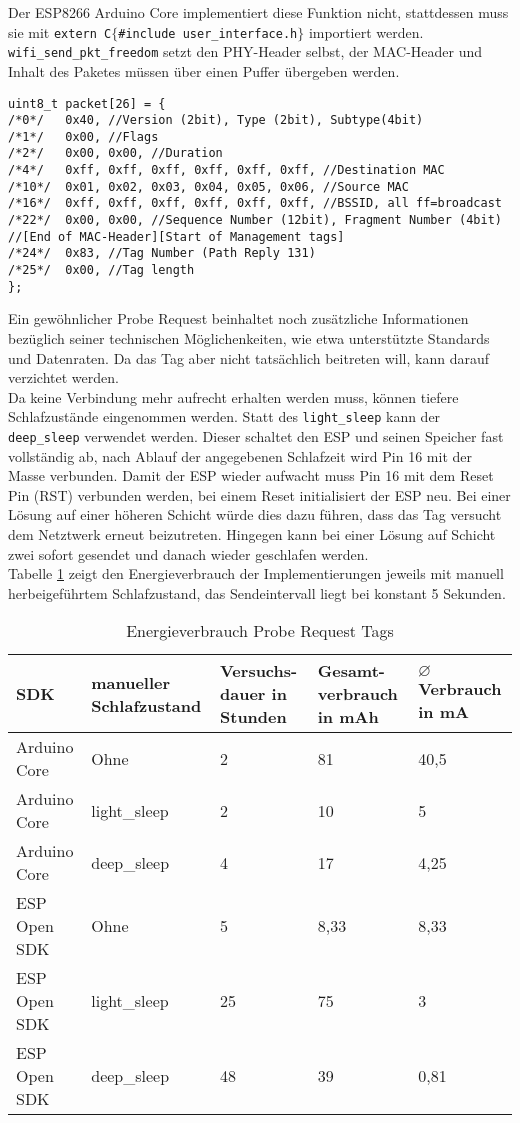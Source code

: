 Der ESP8266 Arduino Core implementiert diese Funktion nicht, stattdessen muss sie mit \texttt{extern \dq C\dq $\lbrace$\#include \dq user\_interface.h\dq $\rbrace$} importiert werden. \\
\texttt{wifi\_send\_pkt\_freedom} setzt den PHY-Header selbst, der MAC-Header und Inhalt des Paketes müssen über einen Puffer übergeben werden.
\begin{verbatim}
uint8_t packet[26] = { 
/*0*/ 	0x40, //Version (2bit), Type (2bit), Subtype(4bit)
/*1*/ 	0x00, //Flags 
/*2*/ 	0x00, 0x00, //Duration
/*4*/   0xff, 0xff, 0xff, 0xff, 0xff, 0xff, //Destination MAC
/*10*/  0x01, 0x02, 0x03, 0x04, 0x05, 0x06, //Source MAC
/*16*/  0xff, 0xff, 0xff, 0xff, 0xff, 0xff, //BSSID, all ff=broadcast
/*22*/  0x00, 0x00, //Sequence Number (12bit), Fragment Number (4bit) 
//[End of MAC-Header][Start of Management tags]
/*24*/  0x83, //Tag Number (Path Reply 131) 
/*25*/ 	0x00, //Tag length
}; 
\end{verbatim}
Ein gewöhnlicher Probe Request beinhaltet noch zusätzliche Informationen bezüglich seiner technischen Möglichenkeiten, wie etwa unterstützte Standards und Datenraten. 
Da das Tag aber nicht tatsächlich beitreten will, kann darauf verzichtet werden. \\
Da keine Verbindung mehr aufrecht erhalten werden muss, können tiefere Schlafzustände eingenommen werden. 
Statt des \texttt{light\_sleep} kann der \texttt{deep\_sleep} verwendet werden.
Dieser schaltet den ESP und seinen Speicher fast vollständig ab, nach Ablauf der angegebenen Schlafzeit wird Pin 16 mit der Masse verbunden.
Damit der ESP wieder aufwacht muss Pin 16 mit dem Reset Pin (RST) verbunden werden, bei einem Reset initialisiert der ESP neu.
Bei einer Lösung auf einer höheren Schicht würde dies dazu führen, dass das Tag versucht dem Netztwerk erneut beizutreten. 
Hingegen kann bei einer Lösung auf Schicht zwei sofort gesendet und danach wieder geschlafen werden.\\
Tabelle \ref{table:probeconsumption} zeigt den Energieverbrauch der Implementierungen jeweils mit manuell herbeigeführtem Schlafzustand, das Sendeintervall liegt bei konstant 5 Sekunden.
\begin{table}[h]
	\centering
	\caption{Energieverbrauch Probe Request Tags}
	\label{table:probeconsumption}
	\begin{tabular}{p{3cm}|p{2.4cm}|p{2cm}|p{2cm}|p{2cm}}
		SDK & manueller Schlafzustand  & Versuchs-dauer in Stunden & Gesamt-verbrauch in mAh & $\varnothing$ Verbrauch in mA \\
		\hline
		Arduino Core & Ohne & 2 & 81 & 40,5 \\
		Arduino Core & light\_sleep & 2 & 10 & 5 \\
		Arduino Core & deep\_sleep & 4 & 17 & 4,25 \\
		ESP Open SDK & Ohne & 5 & 8,33 & 8,33 \\
		ESP Open SDK & light\_sleep & 25 & 75 & 3 \\
		ESP Open SDK & deep\_sleep & 48 & 39 & 0,81 \\
	\end{tabular}
\end{table}

